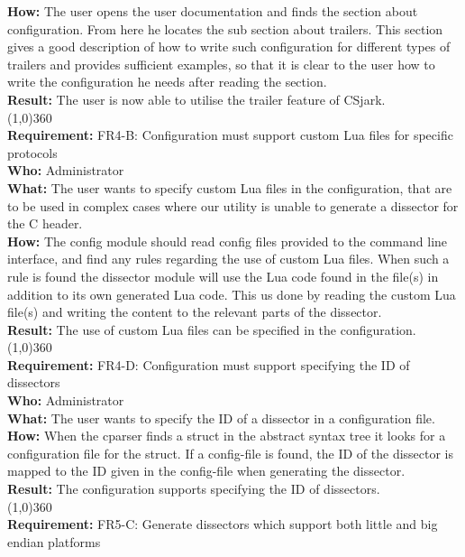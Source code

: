 \textbf{How:} The user opens the user documentation and finds the section about configuration. From here he locates the sub section about trailers. This section gives a good description of how to write such configuration for different types of trailers and provides sufficient examples, so that it is  clear to the user how to write the configuration he needs after reading the section.\\
\textbf{Result:} The user is now able to utilise the trailer feature of CSjark.\\
\line(1,0){360}\\
\textbf{Requirement:} FR4-B: Configuration must support custom Lua files for specific protocols\\
\textbf{Who:} Administrator\\
\textbf{What:} The user wants to specify custom Lua files in the configuration, that are to be used in complex cases where our utility is unable to generate a dissector for the C header.\\
\textbf{How:} The config module should read config files provided to the command line interface, and find any rules regarding the use of custom Lua files. When such a rule is found the dissector module will use the Lua code found in the file(s) in addition to its own generated Lua code.
This us done by reading the custom Lua file(s) and writing the content to the relevant parts of the dissector.\\
\textbf{Result:} The use of custom Lua files can be specified in the configuration.\\
\line(1,0){360}\\
\textbf{Requirement:} FR4-D: Configuration must support specifying the ID of dissectors \\
\textbf{Who:} Administrator\\
\textbf{What:} The user wants to specify the ID of a dissector in a configuration file.\\
\textbf{How:} When the cparser finds a struct in the abstract syntax tree it looks for a configuration file for the struct. If a config-file is found, the ID of the dissector is mapped to the ID given in the config-file when generating the dissector.\\
\textbf{Result:} The configuration supports specifying the ID of dissectors.\\
\line(1,0){360}\\
\textbf{Requirement:} FR5-C: Generate dissectors which support both little and big endian platforms\\
